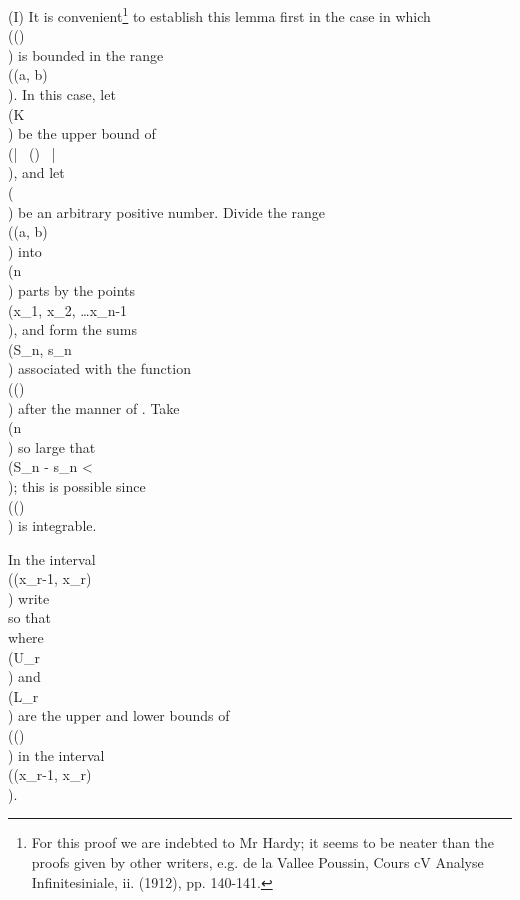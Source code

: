 (I) It is convenient\footnote{For this proof we are indebted to Mr Hardy;
  it seems to be neater than the proofs given by other writers,
  e.g. de la Vallee Poussin,
  Cours cV Analyse Infinitesiniale, ii. (1912), pp. 140-141.}
to establish this lemma first in the case in
which \\(\psi(\theta)\\) is bounded in the range \\((a, b)\\). In this case, let \\(K\\) be
the upper bound of \\(\left| \, \psi(\theta) \, \right| \\), and let \\(\eps\\) be an arbitrary positive
number. Divide the range \\((a, b)\\) into \\(n\\) parts by the points
\\(x_{1}, x_{2}, \ldots x_{n-1}\\), and form the sums \\(S_{n}, s_{n}\\) associated with the function
\\(\psi(\theta)\\) after the manner of . Take \\(n\\) so large that
\\(S_{n} - s_{n} < \eps\\); this is
possible since \\(\psi(\theta)\\) is integrable.

In the interval \\((x_{r-1}, x_{r})\\) write
\\[ 
\psi(\theta) = \psi_{r}(x_{r-1}) + \omega_{r}(\theta),
\\] 
so that
\\[ 
\left| \,  \omega_{r}(\theta)  \, \right|  \leq U_{r} - L_{r},
\\] 
where \\(U_{r}\\) and \\(L_{r}\\) are the upper and lower bounds of
\\(\psi(\theta)\\) in the interval
\\((x_{r-1}, x_{r})\\).


